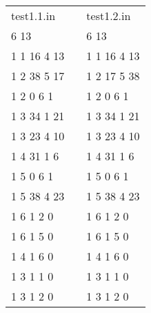 \begin{tabular}{lll}

	test1.1.in & \hspace{5em} & test1.2.in \\

	6 13 & \hspace{5em} & 6 13 \\

	1 1 16 4 13 & \hspace{5em} & 1 1 16 4 13 \\

	1 2 38 5 17 & \hspace{5em} & 1 2 17 5 38 \\

	1 2 0 6 1 & \hspace{5em} & 1 2 0 6 1 \\

	1 3 34 1 21 & \hspace{5em} & 1 3 34 1 21 \\

	1 3 23 4 10 & \hspace{5em} & 1 3 23 4 10 \\

	1 4 31 1 6 & \hspace{5em} & 1 4 31 1 6 \\

	1 5 0 6 1 & \hspace{5em} & 1 5 0 6 1 \\

	1 5 38 4 23 & \hspace{5em} & 1 5 38 4 23 \\

	1 6 1 2 0 & \hspace{5em} & 1 6 1 2 0 \\

	1 6 1 5 0 & \hspace{5em} & 1 6 1 5 0 \\

	1 4 1 6 0 & \hspace{5em} & 1 4 1 6 0 \\

	1 3 1 1 0 & \hspace{5em} & 1 3 1 1 0 \\

	1 3 1 2 0 & \hspace{5em} & 1 3 1 2 0 

\end{tabular} 


